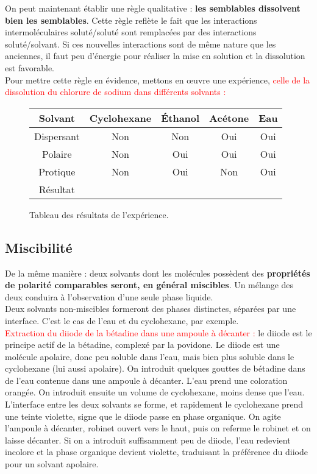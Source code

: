 \documentclass[11pt,a4paper]{report}
\begin{document}
On peut maintenant établir une règle qualitative : \textbf{les semblables dissolvent bien les semblables}. Cette règle reflète le fait que les interactions intermoléculaires soluté/soluté sont remplacées par des interactions soluté/solvant. Si ces nouvelles interactions sont de même nature que les anciennes, il faut peu d'énergie pour réaliser la mise en solution et la dissolution est favorable.\\

Pour mettre cette règle en évidence, mettons en œuvre une expérience, \textcolor{red}{celle de la dissolution du chlorure de sodium dans différents solvants :}
\begin{figure}[h!]
	\begin{center}
	\begin{tabular}{|c|c|c|c|c|}
		\hline
		Solvant    & Cyclohexane & Éthanol & Acétone & Eau \\
		\hline
		Dispersant & Non & Non & Oui & Oui \\
		\hline
		Polaire    & Non & Oui & Oui & Oui \\
		\hline
		Protique   & Non & Oui & Non & Oui \\
		\hline
		Résultat   &  &  &  &  \\
		\hline 
	\end{tabular}	
	\end{center}
	\caption{Tableau des résultats de l'expérience.}
\end{figure}	

\subsection{Miscibilité}

De la même manière : deux solvants dont les molécules possèdent des \textbf{propriétés de polarité comparables seront, en général miscibles}. Un mélange des deux conduira à l'observation d'une seule phase liquide.\\

Deux solvants non-miscibles formeront des phases distinctes, séparées par une interface. C'est le cas de l'eau et du cyclohexane, par exemple.\\


\textcolor{red}{Extraction du diiode de la bétadine dans une ampoule à décanter :} le diiode est le principe actif de la bétadine, complexé par la povidone. Le diiode est une molécule apolaire, donc peu soluble dans l'eau, mais bien plus soluble dans le cyclohexane (lui aussi apolaire). On introduit quelques gouttes de bétadine dans de l'eau contenue dans une ampoule à décanter. L'eau prend une coloration orangée. On introduit ensuite un volume de cyclohexane, moins dense que l'eau. L'interface entre les deux solvants se forme, et rapidement le cyclohexane prend une teinte violette, signe que le diiode passe en phase organique. On agite l'ampoule à décanter, robinet ouvert vers le haut, puis on referme le robinet et on laisse décanter. Si on a introduit suffisamment peu de diiode, l'eau redevient incolore et la phase organique devient violette, traduisant la préférence du diiode pour un solvant apolaire.
\end{document}
